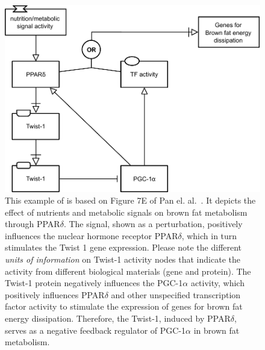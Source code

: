 \begin{figure}[H]
\centering
\vspace*{-0.75em}
\includegraphics[scale=0.8]{images/build/PPAR.pdf}
\caption{This example of \AF is based on Figure 7E of Pan el. al.~\cite{Pan:2009}. It depicts the effect of nutrients and metabolic signals on brown fat metabolism through PPAR$\delta$. The signal, shown as a perturbation, positively influences the nuclear hormone receptor PPAR$\delta$, which in turn stimulates the Twist 1 gene expression. Please note the different \emph{units of information} on Twist-1 activity nodes that indicate the activity from different biological materials (gene and protein). The Twist-1 protein negatively influences the PGC-1$\alpha$ activity, which positively influences PPAR$\delta$ and other unspecified transcription factor activity to stimulate the expression of genes for brown fat energy dissipation. Therefore, the Twist-1, induced by PPAR$\delta$, serves as a negative feedback regulator of PGC-1$\alpha$ in brown fat metabolism.}
\label{fig:af:1}
\end{figure}
